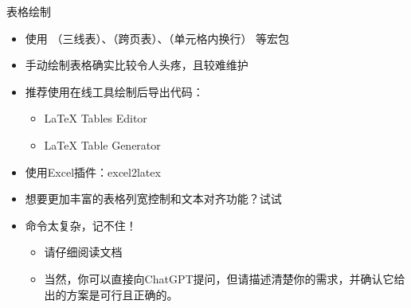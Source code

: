       \begin{frame}[fragile]{表格绘制}
        \begin{itemize}
          \item 使用 （三线表）、（跨页表）、（单元格内换行） 等宏包
          \item 手动绘制表格确实比较令人头疼，且较难维护
          \item 推荐使用在线工具绘制后导出代码：
            \begin{itemize}
              \item \LaTeX{} Tables Editor 
              \item \LaTeX{} Table Generator 
            \end{itemize}
          \item 使用Excel插件：excel2latex 
          \item 想要更加丰富的表格列宽控制和文本对齐功能？试试
          \item 命令太复杂，记不住！
            \begin{itemize}
              \item 请仔细阅读文档
              \item 当然，你可以直接向ChatGPT提问，但请描述清楚你的需求，并确认它给出的方案是可行且正确的。
            \end{itemize}
        \end{itemize}
      \end{frame}
      


